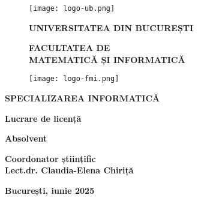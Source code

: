 \begin{titlepage}

    
    \begin{figure}[!htb]
        \centering
        \begin{minipage}{0.2\textwidth}
            \texttt{[image: logo-ub.png]}
        \end{minipage}
        \begin{minipage}{0.5\textwidth}
            \large
            \vspace{0.2cm}
            \begin{center}
                \textbf{UNIVERSITATEA DIN BUCUREȘTI}
            \end{center}
            \vspace{0.3cm}
            \begin{center}
                \textbf{
                    FACULTATEA DE \\
                    MATEMATICĂ ȘI INFORMATICĂ
                }
            \end{center}
        \end{minipage}
        \begin{minipage}{0.2\textwidth}
            \texttt{[image: logo-fmi.png]}
        \end{minipage}
    \end{figure}
    
    \begin{center}
    \textbf{SPECIALIZAREA INFORMATICĂ}
    \end{center}
    
    \vspace{0.5cm}
    
    \begin{center}
    \Large \textbf{Lucrare de licență}
    \end{center}
    
    \begin{center}
    \huge \textbf{\MakeUppercase{\@title}}
    \end{center}
    
    \vspace{1cm}
    
    \begin{center}
    \large \textbf{Absolvent \\ \@author}
    \end{center}
    
    \vspace{0.25cm}
    
    \begin{center}
    \large \textbf{Coordonator științific \\ Lect.dr. Claudia-Elena Chiriță}
    \end{center}
    
    \vspace{2cm}
    
    \begin{center}
    \Large \textbf{București, iunie 2025}
    \end{center}
    \end{titlepage}